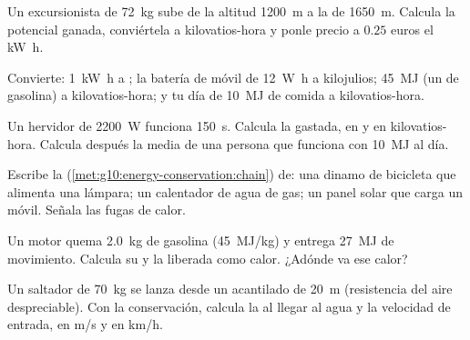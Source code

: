 \begin{exercise}[$\star$]\label{exo:g10:energy-conservation:2}
Un excursionista de \qty{72}{kg} sube de la altitud \qty{1200}{m} a la
de \qty{1650}{m}. Calcula la  potencial ganada, conviértela a
kilovatios-hora y ponle precio a $0.25$ euros el \unit{kW.h}.
\end{exercise}

\begin{exercise}[$\star$]\label{exo:g10:energy-conservation:3}
Convierte: \qty{1}{kW.h} a ; la batería de móvil de \qty{12}{W.h}
a kilojulios; \qty{45}{MJ} (un  de gasolina) a
kilovatios-hora; y tu día de \qty{10}{MJ} de comida a kilovatios-hora.
\end{exercise}

\begin{exercise}[$\star$]\label{exo:g10:energy-conservation:4}
Un hervidor de \qty{2200}{W} funciona \qty{150}{s}. Calcula la 
gastada, en  y en kilovatios-hora. Calcula después la 
media de una persona que funciona con \qty{10}{MJ} al día.
\end{exercise}

\begin{exercise}[$\star$]\label{exo:g10:energy-conservation:5}
Escribe la 
(\cref{met:g10:energy-conservation:chain}) de: una dinamo de bicicleta
que alimenta una lámpara; un calentador de agua de gas; un panel solar
que carga un móvil. Señala las fugas de calor.
\end{exercise}

\begin{exercise}[$\star\star$]\label{exo:g10:energy-conservation:6}
Un motor quema \qty{2.0}{kg} de gasolina (\qty{45}{MJ/kg}) y entrega
\qty{27}{MJ} de movimiento. Calcula su  y la  liberada
como calor. ¿Adónde va ese calor?
\end{exercise}

\begin{exercise}[$\star\star$]\label{exo:g10:energy-conservation:7}
Un saltador de \qty{70}{kg} se lanza desde un acantilado de \qty{20}{m}
(resistencia del aire despreciable). Con la conservación, calcula la
 al llegar al agua y la velocidad de entrada, en
\unit{m/s} y en \unit{km/h}.
\end{exercise}

